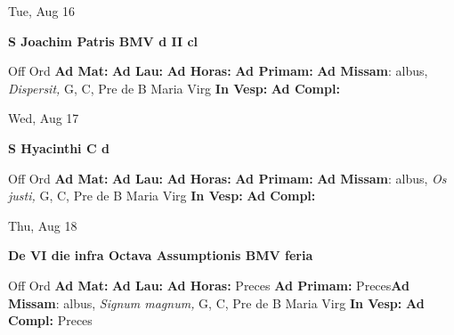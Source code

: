 \documentclass[10pt]{memoir}
\begin{document}
\begin{center}
\begin{minipage}{3.5in}
\vspace{2em}
\begin{center}Tue, Aug 16
\end{center}
\textbf{ \large S Joachim Patris BMV
\textnormal{\normalsize d II cl}}

\begin{justify}Off Ord
\textbf{Ad Mat: }
\textbf{Ad Lau: }
\textbf{Ad Horas: }
\textbf{Ad Primam: }\textbf{Ad Missam}: albus, \textit{Dispersit,} G, C, Pre de B Maria Virg
\textbf{In Vesp: }
\textbf{Ad Compl: }
\end{justify}
\end{minipage}
\end{center}

\begin{center}
\begin{minipage}{3.5in}
\vspace{2em}
\begin{center}Wed, Aug 17
\end{center}
\textbf{ \large S Hyacinthi C
\textnormal{\normalsize d}}

\begin{justify}Off Ord
\textbf{Ad Mat: }
\textbf{Ad Lau: }
\textbf{Ad Horas: }
\textbf{Ad Primam: }\textbf{Ad Missam}: albus, \textit{Os justi,} G, C, Pre de B Maria Virg
\textbf{In Vesp: }
\textbf{Ad Compl: }
\end{justify}
\end{minipage}
\end{center}

\begin{center}
\begin{minipage}{3.5in}
\vspace{2em}
\begin{center}Thu, Aug 18
\end{center}
\textbf{ \large De VI die infra Octava Assumptionis BMV
\textnormal{\normalsize feria}}

\begin{justify}Off Ord
\textbf{Ad Mat: }
\textbf{Ad Lau: }
\textbf{Ad Horas: }Preces
\textbf{Ad Primam: }Preces\textbf{Ad Missam}: albus, \textit{Signum magnum,} G, C, Pre de B Maria Virg
\textbf{In Vesp: }
\textbf{Ad Compl: }Preces
\end{justify}
\end{minipage}
\end{center}
\end{document}

